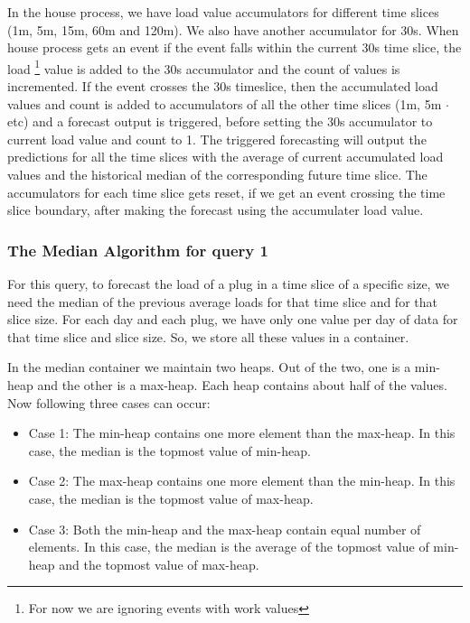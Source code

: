 In the house process, we have load value accumulators for different time slices (1m, 5m, 15m, 60m and 120m). We also have another accumulator for 30s. When house process gets an event if the event falls within the current 30s time slice, the load \footnote{For now we are ignoring events with work values} value is added to the 30s accumulator and the count of values is incremented. If the event crosses the 30s timeslice, then the accumulated load values and count is added to accumulators of all the other time slices (1m, 5m $\cdot$ etc) and a forecast output is triggered, before setting the 30s accumulator to current load value and count to 1. The triggered forecasting will output the predictions for all the time slices with the average of current accumulated load values and the historical median of the corresponding future time slice. The accumulators for each time slice gets reset, if we get an event crossing the time slice boundary, after making the forecast using the accumulater load value.


\subsubsection{The Median Algorithm for query 1}
For this query, to forecast the load of a plug in a time slice of a specific size, we need the median of the previous average loads for that time slice and for that slice size. For each day and each plug, we have only one value per day of data for that time slice and slice size. So, we store all these values in a container.

In the median container we maintain two heaps. Out of the two, one is a min-heap and the other is a max-heap. Each heap contains about half of the values. Now following three cases can occur:
\begin{itemize}
\item Case 1: The min-heap contains one more element than the max-heap. In this case, the median is the topmost value of min-heap.
\item Case 2: The max-heap contains one more element than the min-heap. In this case, the median is the topmost value of max-heap.
\item Case 3: Both the min-heap and the max-heap contain equal number of elements. In this case, the median is the average of the topmost value of min-heap and the topmost value of max-heap.

\end{itemize}

